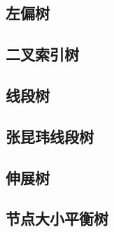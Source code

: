 \documentclass[a4paper]{article}
\begin{document}
\subsection{左偏树}
\subsection{二叉索引树}
\subsection{线段树}
\subsection{张昆玮线段树}
\subsection{伸展树}
\subsection{节点大小平衡树}
\end{document}
